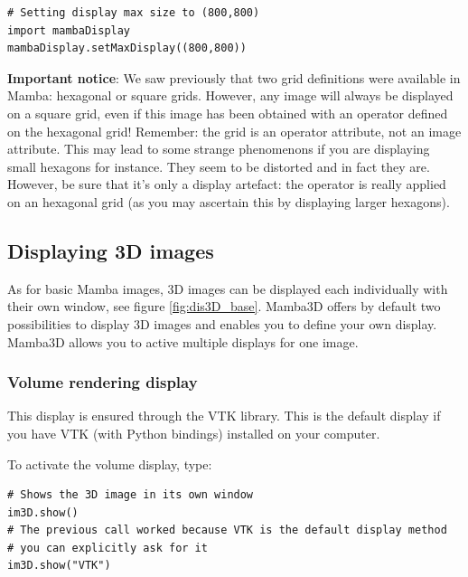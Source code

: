 \documentclass[a4paper,10pt,oneside]{article}
\begin{document}
\lstset{language=Python}
\begin{lstlisting}
# Setting display max size to (800,800)
import mambaDisplay
mambaDisplay.setMaxDisplay((800,800))
\end{lstlisting}

\textbf{Important notice}: We saw previously that two grid definitions were 
available in Mamba: hexagonal or square grids. However, any image will always be 
displayed on a square grid, even if this image has been obtained with an operator 
defined on the hexagonal grid! Remember: the grid is an operator attribute, not an 
image attribute. This may lead to some strange phenomenons if you are displaying 
small hexagons for instance. They seem to be distorted and in fact they are. However, 
be sure that it's only a display artefact: the operator is really applied on an hexagonal 
grid (as you may ascertain this by displaying larger hexagons).


\subsection{Displaying 3D images}
\label{cha:disp_im3D}

As for basic Mamba images, 3D images can be displayed each individually with
their own window, see figure \ref{fig:dis3D_base}. Mamba3D offers by default
two possibilities to display 3D images and enables you to define your own
display. Mamba3D allows you to active multiple displays for one image.


\subsubsection{Volume rendering display}
This display is ensured through the VTK library. This is the default display
if you have VTK (with Python bindings) installed on your computer.

To activate the volume display, type:

\lstset{language=Python}
\begin{lstlisting}
# Shows the 3D image in its own window
im3D.show()
# The previous call worked because VTK is the default display method
# you can explicitly ask for it
im3D.show("VTK")
\end{lstlisting}
\end{document}
